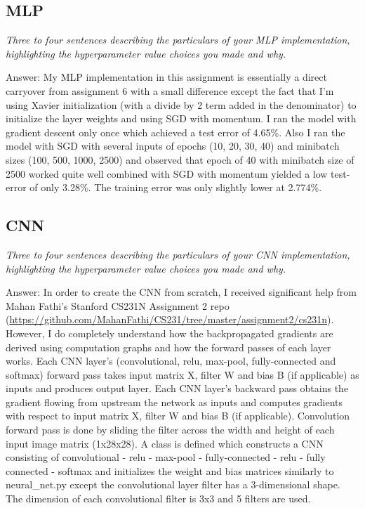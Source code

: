 \documentclass{article}
\def\ans#1{\par\gre{Answer: #1}}{}
\def\gre#1{{\color{gre}#1}}
\begin{document}
\subsection{MLP}
\emph{Three to four sentences describing the particulars of your MLP implementation, highlighting the hyperparameter value choices you made and why.}
\ans{My MLP implementation in this assignment is essentially a direct carryover from assignment 6 with a small difference except the fact that I'm using Xavier initialization (with a divide by 2 term added in the denominator) to initialize the layer weights and using SGD with momentum. I ran the model with gradient descent only once which achieved a test error of 4.65\%. Also I ran the model with SGD with several inputs of epochs (10, 20, 30, 40) and minibatch sizes (100, 500, 1000, 2500) and observed that epoch of 40 with minibatch size of 2500 worked quite well combined with SGD with momentum yielded a low test-error of only 3.28\%. The training error was only slightly lower at 2.774\%.}
\subsection{CNN}
\emph{Three to four sentences describing the particulars of your CNN implementation, highlighting the hyperparameter value choices you made and why.}
\ans{In order to create the CNN from scratch, I received significant help from Mahan Fathi's Stanford CS231N Assignment 2 repo (\url{https://github.com/MahanFathi/CS231/tree/master/assignment2/cs231n}). However, I do completely understand how the backpropagated gradients are derived using computation graphs and how the forward passes of each layer works. Each CNN layer's (convolutional, relu, max-pool, fully-connected and softmax) forward pass takes input matrix X, filter W and bias B (if applicable) as inputs and produces output layer. Each CNN layer's backward pass obtains the gradient flowing from upstream the network as inputs and computes gradients with respect to input matrix X, filter W and bias B (if applicable). Convolution forward pass is done by sliding the filter across the width and height of each input image matrix (1x28x28). A class is defined which constructs a CNN consisting of convolutional - relu - max-pool - fully-connected - relu - fully connected - softmax and initializes the weight and bias matrices similarly to neural\_net.py except the convolutional layer filter has a 3-dimensional shape. The dimension of each convolutional filter is 3x3 and 5 filters are used.}
\end{document}
